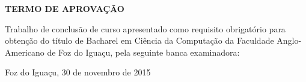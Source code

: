 \begin{folhadeaprovacao} %
\begin{center}
	\vspace*{1cm}  
  	\large\textbf{TERMO DE APROVAÇÃO}
  	
  	\vspace*{1cm} %
  	{\large\textbf\imprimirautor}

   \vspace*{1cm} %
    {\large\textbf\imprimirtitulo}   
 \end{center}     
  
	
	\hspace{.4\textwidth}
	\SingleSpace\noindent\normalsize{Trabalho de conclusão de curso apresentado como requisito obrigatório para obtenção do título de Bacharel em Ciência da Computação da Faculdade Anglo-Americano de Foz do Iguaçu, pela seguinte banca examinadora:}
   
    
  
   \vspace*{0.5cm}  %
   \vspace*{2.5cm}
   \begin{center}
   	{Foz do Iguaçu, 30 de novembro de 2015}
   \end{center}
   
 
\end{folhadeaprovacao}